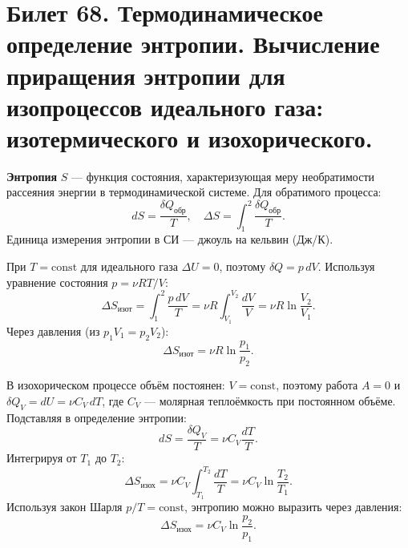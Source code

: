 \section{Билет 68. Термодинамическое определение энтропии. Вычисление приращения энтропии для изопроцессов идеального газа: изотермического и изохорического.}

\begin{definition}
\textbf{Энтропия} $S$ --- функция состояния, характеризующая меру необратимости рассеяния энергии в термодинамической системе. Для обратимого процесса:
\begin{equation}
    dS = \frac{\delta Q_{\text{обр}}}{T}, \quad \Delta S = \int_1^2 \frac{\delta Q_{\text{обр}}}{T}. \label{eq:entropy_def_68}
\end{equation}
Единица измерения энтропии в СИ --- джоуль на кельвин (Дж/К).
\end{definition}

\begin{theorem}
При $T = \text{const}$ для идеального газа $\Delta U = 0$, поэтому $\delta Q = p\,dV$. Используя уравнение состояния $p = \nu RT/V$:
\begin{equation}
    \Delta S_{\text{изот}} = \int_1^2 \frac{p\,dV}{T} = \nu R \int_{V_1}^{V_2} \frac{dV}{V} = \nu R \ln\frac{V_2}{V_1}. \label{eq:delta_S_iso_68}
\end{equation}
Через давления (из $p_1 V_1 = p_2 V_2$):
\begin{equation}
    \Delta S_{\text{изот}} = \nu R \ln\frac{p_1}{p_2}.
\end{equation}
\end{theorem}

\begin{theorem}
В изохорическом процессе объём постоянен: $V = \text{const}$, поэтому работа $A = 0$ и $\delta Q_V = dU = \nu C_V \, dT$, где $C_V$ --- молярная теплоёмкость при постоянном объёме.
Подставляя в определение энтропии:
\begin{equation}
    dS = \frac{\delta Q_V}{T} = \nu C_V \frac{dT}{T}.
\end{equation}
Интегрируя от $T_1$ до $T_2$:
\begin{equation}
    \Delta S_{\text{изох}} = \nu C_V \int_{T_1}^{T_2} \frac{dT}{T} = \nu C_V \ln\frac{T_2}{T_1}. \label{eq:delta_S_isoch_68}
\end{equation}
Используя закон Шарля $p/T = \text{const}$, энтропию можно выразить через давления:
\begin{equation}
    \Delta S_{\text{изох}} = \nu C_V \ln\frac{p_2}{p_1}.
\end{equation}
\end{theorem}


